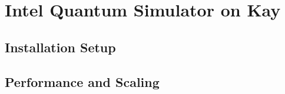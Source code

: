 \section{Intel Quantum Simulator on Kay}
\label{sec:intel_quantum_simulator_on_kay}

\subsection{Installation Setup}
\label{sec:installation_setup}

\subsection{Performance and Scaling}
\label{sec:performance_and_scaling}
